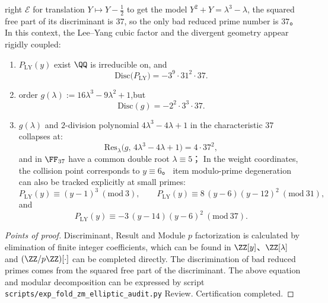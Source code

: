\begin{conclusion}\label{con:xi-terminal-zm-leyang-discriminant-bad-reduction-37}
right \(\mathcal{E}\) for translation \(Y\mapsto Y-\tfrac12\) to get the model
\(
Y^{2}+Y=\lambda^{3}-\lambda
\), the squared free part of its discriminant is \(37\), so the only bad reduced prime number is \(37\)。
In this context, the Lee--Yang cubic factor and the divergent geometry appear rigidly coupled:
\begin{enumerate}
  \item \(P_{\mathrm{LY}}(y)\) exist \(\QQ\) is irreducible on, and
  \[
  \mathrm{Disc}\bigl(P_{\mathrm{LY}}\bigr)=-3^{9}\cdot 31^{2}\cdot 37.
  \]
  \item order \(g(\lambda):=16\lambda^{3}-9\lambda^{2}+1\),but
  \[
  \mathrm{Disc}(g)=-2^{2}\cdot 3^{3}\cdot 37.
  \]
  \item \(g(\lambda)\) and \(2\)-division polynomial \(4\lambda^{3}-4\lambda+1\) in the characteristic \(37\) collapses at:
  \[
  \mathrm{Res}_{\lambda}\bigl(g,\,4\lambda^{3}-4\lambda+1\bigr)=4\cdot 37^{2},
  \]
  and in \(\FF_{37}\) have a common double root \(\lambda\equiv 5\)；
  In the weight coordinates, the collision point corresponds to \(y\equiv 6\)。
  \The item modulo-prime degeneration can also be tracked explicitly at small primes:
  \[
  P_{\mathrm{LY}}(y)\equiv (y-1)^{3}\ (\mathrm{mod}\ 3),\qquad
  P_{\mathrm{LY}}(y)\equiv 8\,(y-6)(y-12)^{2}\ (\mathrm{mod}\ 31),
  \]
  and
  \[
  P_{\mathrm{LY}}(y)\equiv -3\,(y-14)(y-6)^{2}\ (\mathrm{mod}\ 37).
  \]
\end{enumerate}
\end{conclusion}
\begin{proof}[Points of proof]
Discriminant, Result and Module \(p\) factorization is calculated by elimination of finite integer coefficients, which can be found in \(\ZZ[y]\)、\(\ZZ[\lambda]\) and \((\ZZ/p\ZZ)[\cdot]\) can be completed directly.
The discrimination of bad reduced primes comes from the squared free part of the discriminant.
The above equation and modular decomposition can be expressed by script \texttt{scripts/exp\_fold\_zm\_elliptic\_audit.py} Review. Certification completed.
\end{proof}

